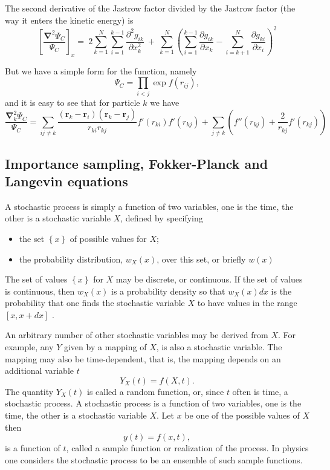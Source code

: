 \documentclass[%
oneside,                 %
final,                   %
10pt]{article}
\begin{document}
The second derivative of the Jastrow factor divided by the Jastrow factor (the way it enters the kinetic energy) is
\[
\left[\frac{\mathbf{\nabla}^2 \Psi_C}{\Psi_C}\right]_x =\  
2\sum_{k=1}^{N}
\sum_{i=1}^{k-1}\frac{\partial^2 g_{ik}}{\partial x_k^2}\ +\ 
\sum_{k=1}^N
\left(
\sum_{i=1}^{k-1}\frac{\partial g_{ik}}{\partial x_k} -
\sum_{i=k+1}^{N}\frac{\partial g_{ki}}{\partial x_i}
\right)^2
\]

But we have a simple form for the function, namely
\[
\Psi_{C}=\prod_{i< j}\exp{f(r_{ij})},
\]
and it is easy to see that for particle  $k$
we have
\[
  \frac{\mathbf{\nabla}^2_k \Psi_C}{\Psi_C }=
\sum_{ij\ne k}\frac{(\mathbf{r}_k-\mathbf{r}_i)(\mathbf{r}_k-\mathbf{r}_j)}{r_{ki}r_{kj}}f'(r_{ki})f'(r_{kj})+
\sum_{j\ne k}\left( f''(r_{kj})+\frac{2}{r_{kj}}f'(r_{kj})\right)
\]

\subsection*{Importance sampling, Fokker-Planck and Langevin equations}

A stochastic process is simply a function of two variables, one is the time,
the other is a stochastic variable $X$, defined by specifying
\begin{itemize}
\item the set $\left\{x\right\}$ of possible values for $X$;

\item the probability distribution, $w_X(x)$,  over this set, or briefly $w(x)$
\end{itemize}

\noindent
The set of values $\left\{x\right\}$ for $X$ 
may be discrete, or continuous. If the set of
values is continuous, then $w_X (x)$ is a probability density so that 
$w_X (x)dx$
is the probability that one finds the stochastic variable $X$ to have values
in the range $[x, x + dx]$ .

     An arbitrary number of other stochastic variables may be derived from
$X$. For example, any $Y$ given by a mapping of $X$, is also a stochastic
variable. The mapping may also be time-dependent, that is, the mapping
depends on an additional variable $t$
\[
                              Y_X (t) = f (X, t) .
\]
The quantity $Y_X (t)$ is called a random function, or, since $t$ often is time,
a stochastic process. A stochastic process is a function of two variables,
one is the time, the other is a stochastic variable $X$. Let $x$ be one of the
possible values of $X$ then
\[
                               y(t) = f (x, t),
\]
is a function of $t$, called a sample function or realization of the process.
In physics one considers the stochastic process to be an ensemble of such
sample functions.
\end{document}
